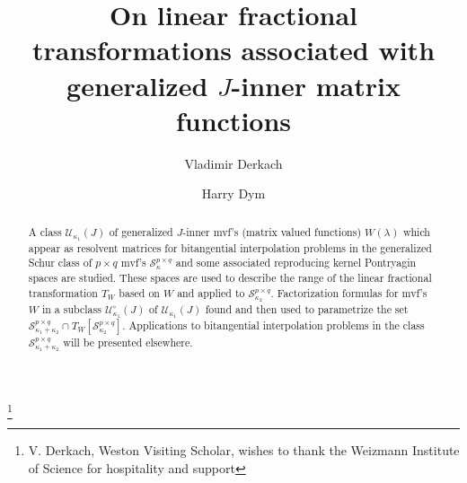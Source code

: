 \documentclass[12pt,twoside,a4paper]{amsart}
\theoremstyle{definition}
\numberwithin{equation}{section}
\begin{document}
\title[Linear fractional transformations]
{On  linear fractional transformations associated with
generalized $J$-inner matrix functions}
\author{Vladimir Derkach}
\address{Department of Mathematics \\
Donetsk State University \\
Donetsk \\
Ukraine} 
\author{Harry Dym}
\address{Department of Mathematics,  \\
Weizmann Institute, Israel} 
\dedicatory{}
\thanks{V. Derkach, Weston Visiting Scholar, wishes to thank the Weizmann Institute of Science
for hospitality and support}

\begin{abstract}
A class ${{\mathcal U}}_{\kappa_1}(J)$ of generalized $J$-inner mvf's (matrix valued
functions) $W({\lambda})$ which appear as resolvent matrices for bitangential
interpolation problems in the generalized Schur class of ${p\times q}$ mvf's
${{\mathcal S}}_\kappa^{p\times q}$ and some associated reproducing kernel Pontryagin spaces
are studied. These spaces are used to describe the range of the linear
fractional transformation $T_W$ based on $W$  and applied to
${\mathcal S}_{\kappa_2}^{p\times q}$. Factorization formulas for mvf's $W$ in a subclass
${{\mathcal U}}_{\kappa_1}^\circ(J)$ of ${{\mathcal U}}_{\kappa_1}(J)$ found and then used to
parametrize the set
${{\mathcal S}}_{\kappa_1+\kappa_2}^{p\times q}\cap T_W[{{\mathcal S}}_{\kappa_2}^{p\times q}]$.
Applications to bitangential interpolation problems in the class
${{\mathcal S}}_{\kappa_1+\kappa_2}^{p\times q}$ will be presented elsewhere.
\end{abstract}

\maketitle
\end{document}

